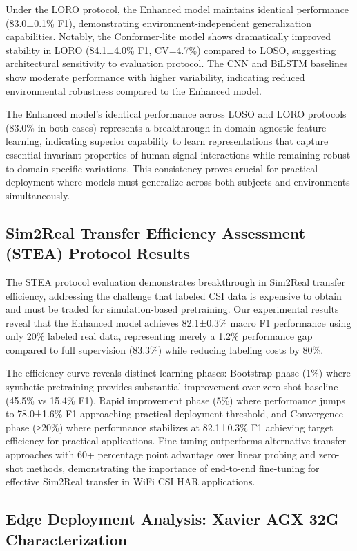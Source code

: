 \documentclass[journal]{IEEEtran}
\begin{document}
Under the LORO protocol, the Enhanced model maintains identical performance (83.0±0.1\% F1), demonstrating environment-independent generalization capabilities. Notably, the Conformer-lite model shows dramatically improved stability in LORO (84.1±4.0\% F1, CV=4.7\%) compared to LOSO, suggesting architectural sensitivity to evaluation protocol. The CNN and BiLSTM baselines show moderate performance with higher variability, indicating reduced environmental robustness compared to the Enhanced model.

The Enhanced model's identical performance across LOSO and LORO protocols (83.0\% in both cases) represents a breakthrough in domain-agnostic feature learning, indicating superior capability to learn representations that capture essential invariant properties of human-signal interactions while remaining robust to domain-specific variations. This consistency proves crucial for practical deployment where models must generalize across both subjects and environments simultaneously.

\subsection{Sim2Real Transfer Efficiency Assessment (STEA) Protocol Results}

The STEA protocol evaluation demonstrates breakthrough in Sim2Real transfer efficiency, addressing the challenge that labeled CSI data is expensive to obtain and must be traded for simulation-based pretraining. Our experimental results reveal that the Enhanced model achieves 82.1±0.3\% macro F1 performance using only 20\% labeled real data, representing merely a 1.2\% performance gap compared to full supervision (83.3\%) while reducing labeling costs by 80\%.

The efficiency curve reveals distinct learning phases: Bootstrap phase (1\%) where synthetic pretraining provides substantial improvement over zero-shot baseline (45.5\% vs 15.4\% F1), Rapid improvement phase (5\%) where performance jumps to 78.0±1.6\% F1 approaching practical deployment threshold, and Convergence phase (≥20\%) where performance stabilizes at 82.1±0.3\% F1 achieving target efficiency for practical applications. Fine-tuning outperforms alternative transfer approaches with 60+ percentage point advantage over linear probing and zero-shot methods, demonstrating the importance of end-to-end fine-tuning for effective Sim2Real transfer in WiFi CSI HAR applications.

\subsection{Edge Deployment Analysis: Xavier AGX 32G Characterization}
\end{document}

